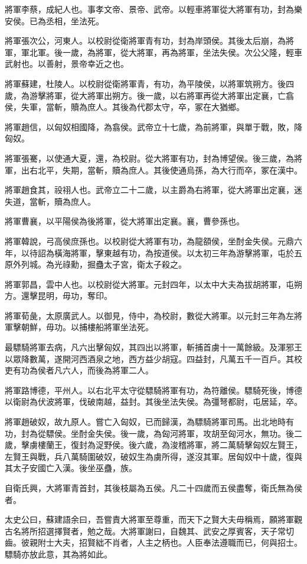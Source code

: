 將軍李蔡，成紀人也。事孝文帝、景帝、武帝。以輕車將軍從大將軍有功，封為樂安侯。已為丞相，坐法死。

將軍張次公，河東人。以校尉從衛將軍青有功，封為岸頭侯。其後太后崩，為將軍，軍北軍。後一歲，為將軍，從大將軍，再為將軍，坐法失侯。次公父隆，輕車武射也。以善射，景帝幸近之也。

將軍蘇建，杜陵人。以校尉從衛將軍青，有功，為平陵侯，以將軍筑朔方。後四歲，為游擊將軍，從大將軍出朔方。後一歲，以右將軍再從大將軍出定襄，亡翕侯，失軍，當斬，贖為庶人。其後為代郡太守，卒，冢在大猶鄉。

將軍趙信，以匈奴相國降，為翕侯。武帝立十七歲，為前將軍，與單于戰，敗，降匈奴。

將軍張騫，以使通大夏，還，為校尉。從大將軍有功，封為博望侯。後三歲，為將軍，出右北平，失期，當斬，贖為庶人。其後使通烏孫，為大行而卒，冢在漢中。

將軍趙食其，祋祤人也。武帝立二十二歲，以主爵為右將軍，從大將軍出定襄，迷失道，當斬，贖為庶人。

將軍曹襄，以平陽侯為後將軍，從大將軍出定襄。襄，曹參孫也。

將軍韓說，弓高侯庶孫也。以校尉從大將軍有功，為龍頟侯，坐酎金失侯。元鼎六年，以待詔為橫海將軍，擊東越有功，為按道侯。以太初三年為游擊將軍，屯於五原外列城。為光祿勳，掘蠱太子宮，衛太子殺之。

將軍郭昌，雲中人也。以校尉從大將軍。元封四年，以太中大夫為拔胡將軍，屯朔方。還擊昆明，毋功，奪印。

將軍荀彘，太原廣武人。以御見，侍中，為校尉，數從大將軍。以元封三年為左將軍擊朝鮮，毋功。以捕樓船將軍坐法死。

最驃騎將軍去病，凡六出擊匈奴，其四出以將軍，斬捕首虜十一萬餘級。及渾邪王以眾降數萬，遂開河西酒泉之地，西方益少胡寇。四益封，凡萬五千一百戶。其校吏有功為侯者凡六人，而後為將軍二人。

將軍路博德，平州人。以右北平太守從驃騎將軍有功，為符離侯。驃騎死後，博德以衛尉為伏波將軍，伐破南越，益封。其後坐法失侯。為彊弩都尉，屯居延，卒。

將軍趙破奴，故九原人。嘗亡入匈奴，已而歸漢，為驃騎將軍司馬。出北地時有功，封為從驃侯。坐酎金失侯。後一歲，為匈河將軍，攻胡至匈河水，無功。後二歲，擊虜樓蘭王，復封為浞野侯。後六歲，為浚稽將軍，將二萬騎擊匈奴左賢王，左賢王與戰，兵八萬騎圍破奴，破奴生為虜所得，遂沒其軍。居匈奴中十歲，復與其太子安國亡入漢。後坐巫蠱，族。

自衛氏興，大將軍青首封，其後枝屬為五侯。凡二十四歲而五侯盡奪，衛氏無為侯者。

太史公曰，蘇建語余曰，吾嘗責大將軍至尊重，而天下之賢大夫毋稱焉，願將軍觀古名將所招選擇賢者，勉之哉。大將軍謝曰，自魏其、武安之厚賓客，天子常切齒。彼親附士大夫，招賢絀不肖者，人主之柄也。人臣奉法遵職而已，何與招士。驃騎亦放此意，其為將如此。